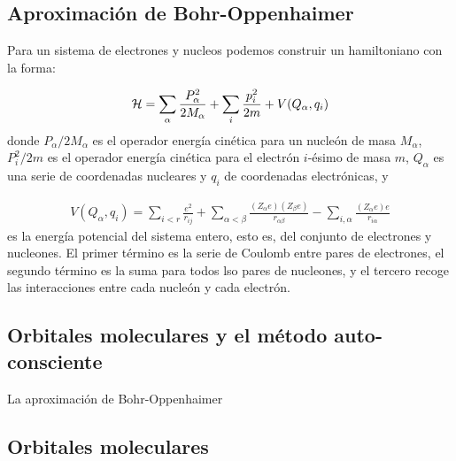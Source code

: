 \subsection{Aproximación de Bohr-Oppenhaimer}

Para un sistema de electrones y nucleos podemos construir un hamiltoniano con la forma:

\begin{eqnarray}
    \mathcal{H} = \sum_\alpha \frac{P_\alpha^2}{2M_\alpha } + \sum_i \frac{p^2_i}{2m} + V(Q_\alpha, q_i)
\end{eqnarray}
donde $P_\alpha/2M_\alpha$ es el operador energía cinética para un nucleón de masa $M_\alpha$, $P_i^2 / 2m$ es el operador energía cinética para el electrón $i$-ésimo de masa $m$, $Q_\alpha$ es una serie de coordenadas nucleares y $q_i$ de coordenadas electrónicas, y 

\begin{eqnarray}
    V(Q_\alpha,q_i) = \sum_{i<r} \frac{e^2}{r_{ij}} + \sum_{\alpha < \beta} \frac{(Z_\alpha e)(Z_\beta e)}{r_{\alpha \beta}} - \sum_{i,\alpha} \frac{(Z_\alpha e)e}{r_{i\alpha}}
\end{eqnarray}
es la energía potencial del sistema entero, esto es, del conjunto de electrones y nucleones. El primer término es la serie de Coulomb entre pares de electrones, el segundo término es la suma para todos lso pares de nucleones, y el tercero recoge las interacciones entre cada nucleón y cada electrón. 


\subsection{Orbitales moleculares y el método auto-consciente}

La aproximación de Bohr-Oppenhaimer 


\subsection{Orbitales moleculares}




